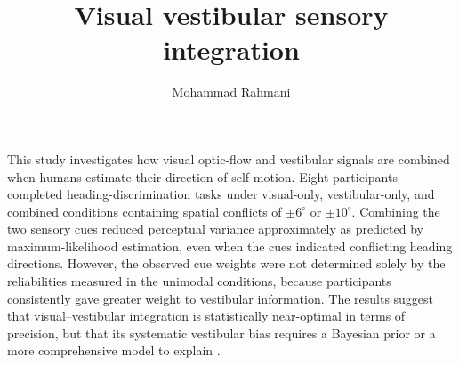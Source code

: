 \documentclass[a4paper]{article}
\title{Visual vestibular sensory integration}
\date{}
\author{Mohammad Rahmani}
\begin{document}
    \maketitle
    This study investigates how visual optic-flow and vestibular signals are combined when humans estimate their direction of self-motion.
    Eight participants completed heading-discrimination tasks under visual-only, vestibular-only, and combined conditions containing spatial conflicts of $\pm 6^{\circ}$ or $\pm 10^{\circ}$.
    Combining the two sensory cues reduced perceptual variance approximately as predicted by maximum-likelihood estimation, even when the cues indicated conflicting heading directions.
    However, the observed cue weights were not determined solely by the reliabilities measured in the unimodal conditions, because participants consistently gave greater weight to vestibular information.
    The results suggest that visual--vestibular integration is statistically near-optimal in terms of precision, but that its systematic vestibular bias requires a Bayesian prior or a more comprehensive model to explain \cite{butler-2010-bayesian-integration-of-visual-and-vestibular-signals-for-heading}.
    
    
\end{document}
